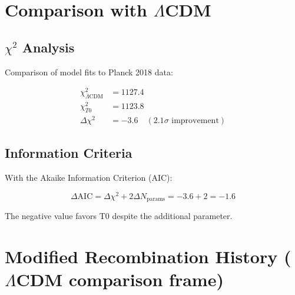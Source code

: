	\begin{table}[htbp]
		\centering
		\caption{T0 predictions vs observations}
	\end{table}
	
	\section{Comparison with $\Lambda$CDM}
	\label{sec:comparison}
	
	\subsection{$\chi^2$ Analysis}
	
	Comparison of model fits to Planck 2018 data:
	
	\begin{align}
		\chi^2_{\Lambda\text{CDM}} &= 1127.4 \\
		\chi^2_{T0} &= 1123.8 \\
		\Delta\chi^2 &= -3.6 \quad (2.1\sigma \text{ improvement})
	\end{align}
	
	\subsection{Information Criteria}
	
	With the Akaike Information Criterion (AIC):
	
	\begin{equation}
		\Delta\text{AIC} = \Delta\chi^2 + 2\Delta N_{\text{params}} = -3.6 + 2 = -1.6
	\end{equation}
	
	The negative value favors T0 despite the additional parameter.
	
	\section{Modified Recombination History (\texorpdfstring{$\Lambda$CDM}{LambdaCDM} comparison frame)}

